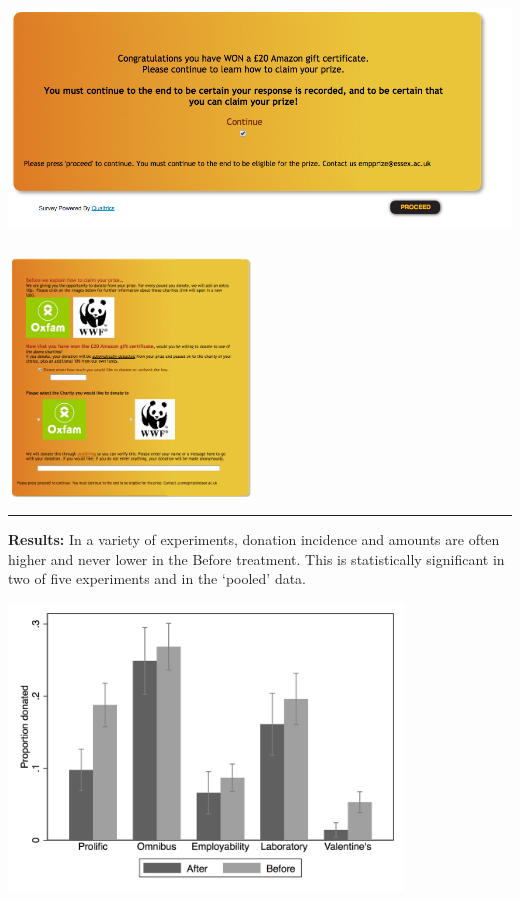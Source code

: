 \documentclass[]{article}
\begin{document}
\includegraphics[height=2.5in]{picsfigs/wonamazon.png}

\includegraphics[height=2.5in]{picsfigs/after_amazon.png}

\begin{center}\rule{0.5\linewidth}{\linethickness}\end{center}

\textbf{Results:} In a variety of experiments, donation incidence and amounts are often higher and never lower in the Before treatment. This is statistically significant in two of five experiments and in the `pooled' data.

\includegraphics[height=3in]{picsfigs/BarGrDonpropHiBefore_vAfter.png}
\end{document}

